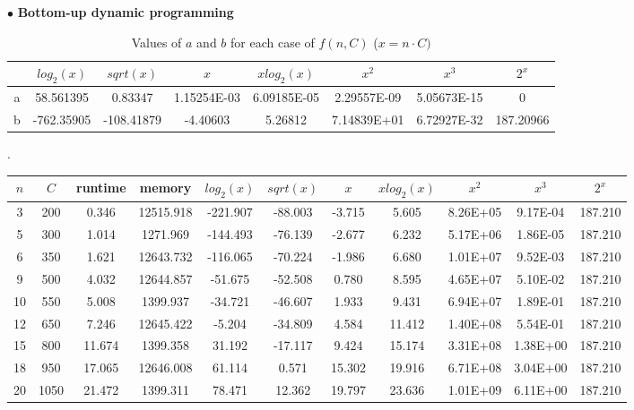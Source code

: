 \documentclass{article}
\begin{document}
\indent $\bullet$ \textbf{Bottom-up dynamic programming}

\begin{center}
\begin{table}[H]
    \begin{adjustbox}{width=1.1\textwidth,center}
        \begin{tabular}{|c|c|c|c|c|c|c|c|}
        \hline
        {} & $log_2(x)$ & $sqrt(x)$ & $x$ & $xlog_2(x)$ & $x^2$ & $x^3$ & $2^x$ \\
        \hline
        a & 58.561395	&	0.83347	&	1.15254E-03	&	6.09185E-05	&	2.29557E-09	&	5.05673E-15	&	0	\\ 	\hline
        b & -762.35905	&	-108.41879	&	-4.40603	&	5.26812	&	7.14839E+01	&	6.72927E-32	&	 187.20966	\\ 	\hline
        \end{tabular}
    \end{adjustbox}
    \caption{Values of $a$ and $b$ for each case of $f(n,C)$ ($x = n\cdot C)$}.
\end{table}
    \setlength{\LTleft}{-25cm plus -1fill}
    \setlength{\LTright}{\LTleft}
    \begin{longtable}{|c|c|c|c|c|c|c|c|c|c|c|}
    \hline
        $n$ & $C$ & runtime & memory & $log_2(x)$ & $sqrt(x)$ & $x$ & $xlog_2(x)$ & $x^2$ & $x^3$ & $2^x$ \\
        \hline
3	&	200	&	0.346	&	12515.918	&	-221.907	&	-88.003	&	-3.715	&	5.605	&	8.26E+05	&	9.17E-04	&	187.210	\\	\hline
 5	&	300	&	1.014	&	1271.969	&	-144.493	&	-76.139	&	-2.677	&	6.232	&	5.17E+06	&	1.86E-05	&	187.210	\\	\hline
6	&	350	&	1.621	&	12643.732	&	-116.065	&	-70.224	&	-1.986	&	6.680	&	1.01E+07	&	9.52E-03	&	187.210	\\	\hline
9	&	500	&	4.032	&	12644.857	&	-51.675	&	-52.508	&	0.780	&	8.595	&	4.65E+07	&	5.10E-02	&	187.210	\\	\hline
10	&	550	&	5.008	&	1399.937	&	-34.721	&	-46.607	&	1.933	&	9.431	&	6.94E+07	&	1.89E-01	&	187.210	\\	\hline
12	&	650	&	7.246	&	12645.422	&	-5.204	&	-34.809	&	4.584	&	11.412	&	1.40E+08	&	5.54E-01	&	187.210	\\	\hline
15	&	800	&	11.674	&	1399.358	&	31.192	&	-17.117	&	9.424	&	15.174	&	3.31E+08	&	1.38E+00	&	187.210	\\	\hline
18	&	950	&	17.065	&	12646.008	&	61.114	&	0.571	&	15.302	&	19.916	&	6.71E+08	&	3.04E+00	&	187.210	\\	\hline
20	&	1050	&	21.472	&	1399.311	&	78.471	&	12.362	&	19.797	&	23.636	&	1.01E+09	&	6.11E+00	&	187.210	\\	\hline

\end{longtable}
\end{center}
\end{document}
